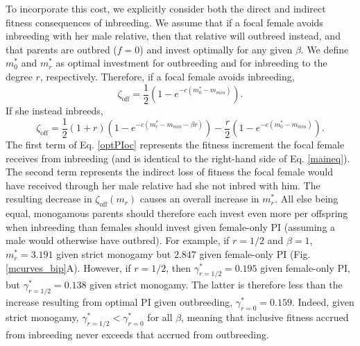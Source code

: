 \documentclass[10pt,letterpaper]{article}
\begin{document}
To incorporate this cost, we explicitly consider both the direct and indirect fitness consequences of inbreeding. We assume that if a focal female avoids inbreeding with her male relative, then that relative will outbreed instead, and that parents are outbred ($f=0$) and invest optimally for any given $\beta$. We define $m^{*}_{0}$ and $m^{*}_{r}$ as optimal investment for outbreeding and for inbreeding to the degree $r$, respectively. Therefore, if a focal female avoids inbreeding,
\begin{equation} \label{optPI}
\zeta_{\textrm{off}} = \frac{1}{2}\left(1-e^{-c\left(m^{*}_{0}-m_{min}\right)}\right).
\end{equation}
If she instead inbreeds,
\begin{equation} \label{optPIoc}
\zeta_{\textrm{off}} = \frac{1}{2}\left(1+r\right)\left(1-e^{-c\left(m^{*}_{r}-m_{min}-\beta r\right)}\right) - \frac{r}{2}\left(1-e^{-c\left(m^{*}_{0}-m_{min}\right)}\right).
\end{equation} 
The first term of Eq. \ref{optPIoc} represents the fitness increment the focal female receives from inbreeding (and is identical to the right-hand side of Eq. \ref{maineq}). The second term represents the indirect loss of fitness the focal female would have received through her male relative had she not inbred with him. The resulting decrease in $\zeta_{\textrm{off}}(m_{r})$ causes an overall increase in $m^{*}_{r}$. All else being equal, monogamous parents should therefore each invest even more per offspring when inbreeding than females should invest given female-only PI (assuming a male would otherwise have outbred). For example, if $r=1/2$ and $\beta=1$, $m^{*}_{r}= 3.191$ given strict monogamy but $2.847$ given female-only PI (Fig. \ref{mcurves_bip}A).  However, if $r=1/2$, then $\gamma^{*}_{r=1/2}=0.195$ given female-only PI, but $\gamma^{*}_{r=1/2}=0.138$ given strict monogamy. The latter is therefore less than the increase resulting from optimal PI given outbreeding, $\gamma^{*}_{r=0}=0.159$. Indeed, given strict monogamy, $\gamma^{*}_{r=1/2} < \gamma^{*}_{r=0}$ for all $\beta$, meaning that inclusive fitness accrued from inbreeding never exceeds that accrued from outbreeding. 
\end{document}
